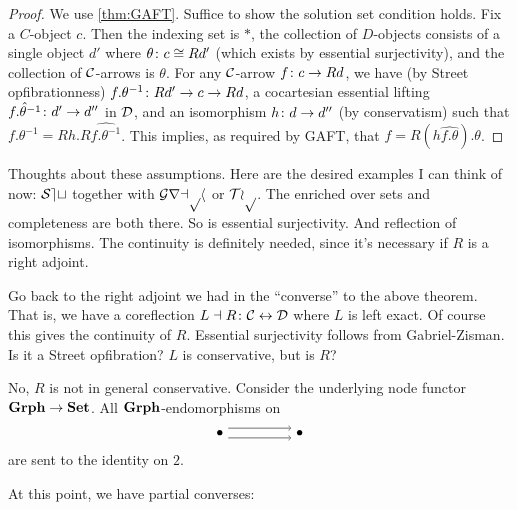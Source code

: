 \documentclass{amsart}
\begin{document}
\begin{proof}
	We use \ref{thm:GAFT}.  Suffice to show the solution set condition holds.  Fix a $ C $-object $ c $.  Then the indexing set is $ \ast $, the collection of $ D $-objects consists of a single object $ d' $ where $ \theta \colon c \cong Rd' $ (which exists by essential surjectivity), and the collection of $ \mathcal{C} $-arrows is $ { \theta } $.  For any $ \mathcal{C} $-arrow $ f \colon c \to Rd $, we have (by Street opfibrationness) $ f . \theta^{-1} \colon Rd' \to c \to Rd $, a cocartesian essential lifting $ \hat{ f . \theta^{-1} } \colon d' \to d'' $ in $ \mathcal{D} $, and an isomorphism $ h \colon d \to d'' $ (by conservatism) such that $ f . \theta^{-1} = Rh . R \hat{ f . \theta^{-1} } $.  This implies, as required by GAFT, that $ f = R (h\hat{ f . \theta }) . \theta $.
\end{proof}

Thoughts about these assumptions. Here are the desired examples I can think of now: $ \mathcal{Set} $ together with $ \mathcal{Graph} $ or $ \mathcal{Top} $. The enriched over sets and completeness are both there. So is essential surjectivity. And reflection of isomorphisms.  The continuity is definitely needed, since it's necessary if $ R $ is a right adjoint. 

Go back to the right adjoint we had in the ``converse'' to the above theorem.  That is, we have a coreflection $ L \dashv R \colon \mathcal{C} \leftrightarrow \mathcal{D} $ where $ L $ is left exact.  Of course this gives the continuity of $ R $. Essential surjectivity follows from Gabriel-Zisman. Is it a Street opfibration? $ L $ is conservative, but is $ R $?

\begin{ex}
	No, $ R $ is not in general conservative.  Consider the underlying node functor $ \mathbf{Grph} \to \mathbf{Set} $.  All $ \mathbf{Grph} $-endomorphisms on
	\[
	\begin{tikzpicture}
		\node (a) at (0,0) {$ \bullet $};
		\node (b) at (2,0) {$ \bullet $};
		\draw [->] (a.30) to (b.150);
		\draw [->] (a.-30) to (b.-150);
	\end{tikzpicture}
	\]
	are sent to the identity on $ 2 $.
\end{ex}

At this point, we have partial converses:

\hfill
{}
\end{document}
